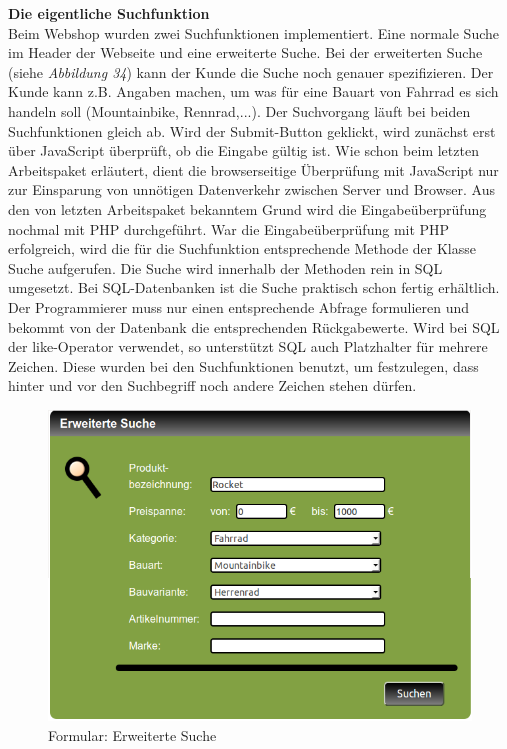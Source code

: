 \textbf{Die eigentliche Suchfunktion}\\
Beim Webshop wurden zwei Suchfunktionen implementiert. Eine \glqq normale\grqq{} Suche im Header der Webseite und eine \glqq erweiterte\grqq{} Suche. Bei der erweiterten Suche (siehe \textit{Abbildung 34}) kann der Kunde die Suche noch genauer spezifizieren. Der Kunde kann z.B. Angaben machen, um was für eine Bauart von Fahrrad es sich handeln soll (Mountainbike, Rennrad,...). Der Suchvorgang läuft bei beiden Suchfunktionen gleich ab. Wird der Submit-Button geklickt, wird zunächst erst über JavaScript überprüft, ob die Eingabe gültig ist. Wie schon beim letzten Arbeitspaket erläutert, dient die browserseitige Überprüfung mit JavaScript nur zur Einsparung von unnötigen Datenverkehr zwischen Server und Browser. Aus den von letzten Arbeitspaket bekanntem Grund wird die Eingabeüberprüfung nochmal mit PHP durchgeführt. War die Eingabeüberprüfung mit PHP erfolgreich, wird die für die Suchfunktion entsprechende Methode der Klasse \glqq Suche\grqq{} aufgerufen. Die Suche wird innerhalb der Methoden rein in SQL umgesetzt. Bei SQL-Datenbanken ist die Suche praktisch schon fertig erhältlich. Der Programmierer muss nur einen entsprechende Abfrage formulieren und bekommt von der Datenbank die entsprechenden Rückgabewerte. Wird bei SQL der \glqq like\grqq{}-Operator verwendet, so unterstützt SQL auch Platzhalter für mehrere Zeichen. Diese wurden bei den Suchfunktionen benutzt, um festzulegen, dass hinter und vor den Suchbegriff noch andere Zeichen stehen dürfen.

\begin{figure}[H]
	\begin{center}
			\includegraphics[width=115mm]{Bilder/erweiterte_suche.png}
	\end{center}
	\caption{Formular: Erweiterte Suche}
\end{figure}

